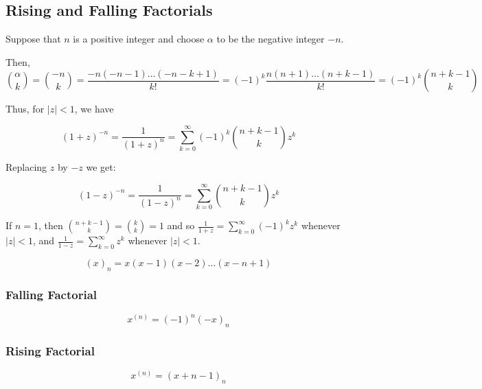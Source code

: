\subsection{Rising and Falling Factorials}

\begin{defn}
Suppose that $n$ is a positive integer and choose $\alpha$ to be the negative integer $-n$. 

Then, \[\binom{\alpha}{k} = \binom{-n}{k} = \frac{-n(-n-1) \ldots (-n-k+1)}{k!} = (-1)^{k} \frac{n(n+1) \ldots (n+k-1)}{k!} = (-1)^{k} \binom{n+k-1}{k}\]

Thus, for $|z| < 1$, we have

\[(1+z)^{-n} = \frac{1}{(1+z)^{n}} = \sum_{k=0}^{\infty} (-1)^{k} \binom{n+k-1}{k} z^{k}\]

Replacing $z$ by $-z$ we get:

\[(1-z)^{-n} = \frac{1}{(1-z)^{n}} = \sum_{k=0}^{\infty} \binom{n+k-1}{k} z^{k}\]

If $n=1$, then $\binom{n+k-1}{k} = \binom{k}{k} =1$ and so $\frac{1}{1+z} = \sum_{k=0}^{\infty} (-1)^{k}z^{k}$ whenever $|z| < 1$, and $\frac{1}{1-z} = \sum_{k=0}^{\infty} z^{k}$ whenever $|z| <1$.
\end{defn}

\medskip

\begin{nota}
    \[(x)_{n} = x(x-1)(x-2) \ldots (x-n+1)\]
\end{nota}

\medskip


\subsubsection{Falling Factorial}

\[x^{(n)}={(-1)}^{n}{(-x)}_{n}\]

\subsubsection{Rising Factorial}

 \[x^{(n)}={(x+n-1)}_{n}\]

